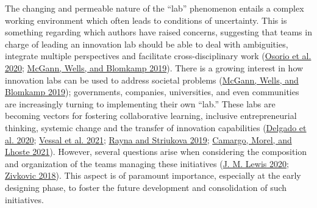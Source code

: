\documentclass[AMA,STIX1COL,APA,STIX2COL]{WileyNJD-v2}
\begin{document}
The changing and permeable nature of the ``lab'' phenomenon entails a
complex working environment which often leads to conditions of
uncertainty. This is something regarding which authors have raised
concerns, suggesting that teams in charge of leading an innovation lab
should be able to deal with ambiguities, integrate multiple perspectives
and facilitate cross-disciplinary work
(\protect\hyperlink{ref-Osorio2020}{Osorio et al. 2020};
\protect\hyperlink{ref-McGann2019}{McGann, Wells, and Blomkamp 2019}).
There is a growing interest in how innovation labs can be used to
address societal problems (\protect\hyperlink{ref-McGann2019}{McGann,
Wells, and Blomkamp 2019}); governments, companies, universities, and
even communities are increasingly turning to implementing their own
``lab.'' These labs are becoming vectors for fostering collaborative
learning, inclusive entrepreneurial thinking, systemic change and the
transfer of innovation capabilities
(\protect\hyperlink{ref-Delgado2020}{Delgado et al. 2020};
\protect\hyperlink{ref-RezaeeVessal2021}{Vessal et al. 2021};
\protect\hyperlink{ref-Rayna2019}{Rayna and Striukova 2019};
\protect\hyperlink{ref-Camargo2021}{Camargo, Morel, and Lhoste 2021}).
However, several questions arise when considering the composition and
organization of the teams managing these initiatives
(\protect\hyperlink{ref-Lewis2020}{J. M. Lewis 2020};
\protect\hyperlink{ref-Zivkovic2018}{Zivkovic 2018}). This aspect is of
paramount importance, especially at the early designing phase, to foster
the future development and consolidation of such initiatives.
\end{document}
